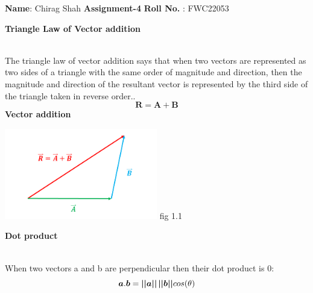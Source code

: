 \documentclass[10pt,a4paper]{report}
\begin{document}
\raggedright \textbf{Name}:\hspace{1mm} Chirag Shah\hspace{3cm} \Large \textbf{Assignment-4}\hspace{2.5cm} %
\normalsize \textbf{Roll No.} :\hspace{1mm} FWC22053\vspace{1cm}
\begin{multicols}{2}

\textbf{Triangle Law of Vector addition }
\vspace{0.5cm}\raggedright \\
The triangle law of vector addition says that when two vectors are represented as two sides of a triangle with the same order of magnitude and direction, then the magnitude and direction of the resultant vector is represented by the third side of the triangle taken in reverse order..\vspace{3mm} \\ 
\begin{equation}
\boldsymbol{R}=\boldsymbol{A}+\boldsymbol{B} 
\end{equation}
\vspace{2mm}\textbf{Vector addition }
 \begin{center}
 \includegraphics[width=0.5\textwidth]{tri.png}  
 fig 1.1   \vspace{2mm}\\
 \end{center}\vspace{5mm}
\textbf{Dot product}\vspace{1mm}
\raggedright \\When two vectors a and b are perpendicular then their dot product is 0:\vspace{3mm} 
\begin{equation}
\boldsymbol{a}.\boldsymbol{b}=\boldsymbol{||a||}\hspace{0.5mm}\boldsymbol{||b||}cos(\theta)
\end{equation}

\end{multicols}
\end{document}
